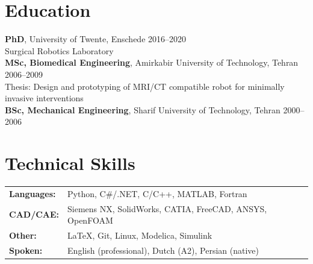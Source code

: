 \documentclass[10pt,a4paper]{article}
\begin{document}
\section{Education}

\textbf{PhD}, University of Twente, Enschede \hfill 2016--2020 \\
{\small Surgical Robotics Laboratory } \\[2pt]
\textbf{MSc, Biomedical Engineering}, Amirkabir University of Technology, Tehran \hfill 2006--2009 \\
{\small Thesis: Design and prototyping of MRI/CT compatible robot for minimally invasive interventions} \\[2pt]
\textbf{BSc, Mechanical Engineering}, Sharif University of Technology, Tehran \hfill 2000--2006

\section{Technical Skills}

{\small
\begin{tabularx}{\textwidth}{@{}lX@{}}
 \textbf{Languages:} & Python, C\#/.NET, C/C++, MATLAB, Fortran \\
 \textbf{CAD/CAE:}   & Siemens NX, SolidWorks, CATIA, FreeCAD, ANSYS, OpenFOAM \\
 \textbf{Other:}    & \LaTeX, Git, Linux, Modelica, Simulink \\
 \textbf{Spoken:}   & English (professional), Dutch (A2), Persian (native) \\
\end{tabularx}
}
\end{document}
